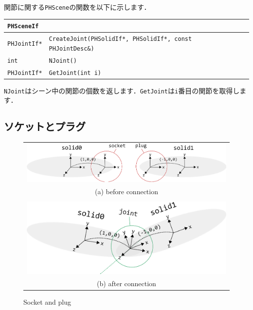 \KLUDGE 関節に関する\texttt{PHScene}\KLUDGE の関数を以下に示します．

\begin{center}
\begin{tabular}{p{.15\hsize}p{.75\hsize}p{.0\hsize}}
\multicolumn{3}{l}{\texttt{PHSceneIf}}													\\ \midrule
\texttt{PHJointIf*}	& \texttt{CreateJoint(PHSolidIf*, PHSolidIf*, const PHJointDesc\&)}	& \\
\texttt{int}		& \texttt{NJoint()}													& \\
\texttt{PHJointIf*}	& \texttt{GetJoint(int i)}											& \\
\end{tabular}
\end{center}

\texttt{NJoint}\KLUDGE はシーン中の関節の個数を返します．\texttt{GetJoint}\KLUDGE は\texttt{i}\KLUDGE 番目の関節を取得します．


\subsection*{\KLUDGE ソケットとプラグ}

\begin{figure}[t]
\begin{center}
\begin{tabular}{c}
\includegraphics[clip, width=.5\hsize]{fig/socket_plug1.eps} \\
(a) before connection \\
\\
\includegraphics[clip, width=.5\hsize]{fig/socket_plug2.eps} \\
(b) after connection \\
\end{tabular}
\end{center}
\caption{Socket and plug}
\label{fig_socket_plug}
\end{figure}


